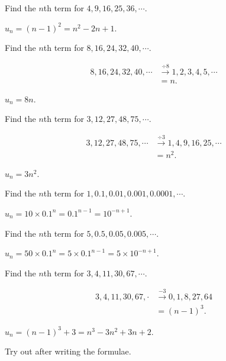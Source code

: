 \documentclass[8pt]{article}
\begin{document}
			\prob Find the \(n\)th term for \(4, 9, 16, 25, 36, \cdots\).
			
			\solution \(u_n = (n-1)^2 = n^2 - 2n + 1\).\newline

			\prob Find the \(n\)th term for \(8, 16, 24, 32, 40, \cdots\).
			
			\solution
			
			\begin{align*}
				8, 16, 24, 32, 40, \cdots &\xrightarrow{\div 8} 1, 2, 3, 4, 5, \cdots\\
				&=n.
			\end{align*}
			
			\(u_n = 8n\).\newline

			\prob Find the \(n\)th term for \(3, 12, 27, 48, 75, \cdots\).
			
			\solution
			
			\begin{align*}
				3, 12, 27, 48, 75, \cdots &\xrightarrow{\div 3} 1, 4, 9, 16, 25, \cdots\\
				&= n^2.
			\end{align*}

			\(u_n = 3 n^2\).\newline

			\prob Find the \(n\)th term for \(1, 0.1, 0.01, 0.001, 0.0001, \cdots\).
			
			\solution \(u_n = 10 \times 0.1^{n} = 0.1^{n-1} = 10^{-n+1}\).\newline

			\prob Find the \(n\)th term for \(5, 0.5, 0.05, 0.005, \cdots\).
			
			\solution \(u_n = 50 \times 0.1^{n} = 5 \times 0.1^{n-1} = 5 \times 10^{-n+1}\).\newline

			\prob Find the \(n\)th term for \(3, 4, 11, 30, 67,\cdots\).
			
			\solution
			
			\begin{align*}
				3, 4, 11, 30, 67, \cdot &\xrightarrow{-3} 0, 1, 8, 27, 64\\
				&= (n-1)^3.
			\end{align*}
			
			\(u_n = (n-1)^3 + 3 = n^3 - 3n^2 + 3n + 2\).\newline

			\meth {} Try out after writing the formulae.\newline
\end{document}
